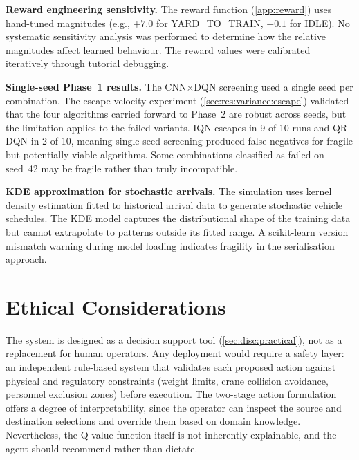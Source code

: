\textbf{Reward engineering sensitivity.} The reward function (\cref{app:reward}) uses hand-tuned magnitudes (e.g., $+7.0$ for YARD\_TO\_TRAIN, $-0.1$ for IDLE). No systematic sensitivity analysis was performed to determine how the relative magnitudes affect learned behaviour. The reward values were calibrated iteratively through tutorial debugging.

\textbf{Single-seed Phase~1 results.} The CNN$\times$DQN screening used a single seed per combination. The escape velocity experiment (\cref{sec:res:variance:escape}) validated that the four algorithms carried forward to Phase~2 are robust across seeds, but the limitation applies to the failed variants. IQN escapes in 9 of 10 runs and QR-DQN in 2 of 10, meaning single-seed screening produced false negatives for fragile but potentially viable algorithms. Some combinations classified as failed on seed~42 may be fragile rather than truly incompatible.

\textbf{KDE approximation for stochastic arrivals.} The simulation uses kernel density estimation fitted to historical arrival data to generate stochastic vehicle schedules. The KDE model captures the distributional shape of the training data but cannot extrapolate to patterns outside its fitted range. A scikit-learn version mismatch warning during model loading indicates fragility in the serialisation approach.

\section{Ethical Considerations}
\label{sec:disc:ethical}

The system is designed as a decision support tool (\cref{sec:disc:practical}), not as a replacement for human operators. Any deployment would require a safety layer: an independent rule-based system that validates each proposed action against physical and regulatory constraints (weight limits, crane collision avoidance, personnel exclusion zones) before execution. The two-stage action formulation offers a degree of interpretability, since the operator can inspect the source and destination selections and override them based on domain knowledge. Nevertheless, the Q-value function itself is not inherently explainable, and the agent should recommend rather than dictate.
